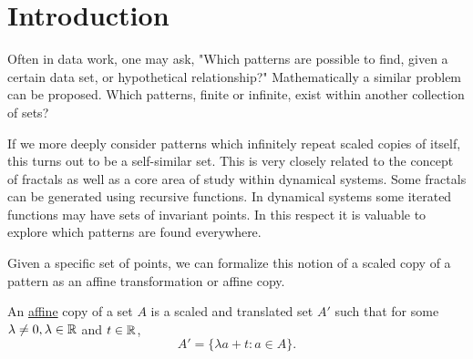 \chapter{Introduction}


Often in data work, one may ask, "Which patterns are possible to find, given a certain data set, or hypothetical relationship?"  Mathematically a similar problem can be proposed.  Which patterns, finite or infinite, exist within another collection of sets?  

If we more deeply consider patterns which infinitely repeat scaled copies of itself, this turns out to be a self-similar set.  This is very closely related to the concept of fractals as well as a core area of study within dynamical systems.  Some fractals can be generated using recursive functions.  In dynamical systems some iterated functions may have sets of invariant points.  In this respect it is valuable to explore which patterns are found everywhere. 

Given a specific set of points, we can formalize this notion of a scaled copy of a pattern as an affine transformation or affine copy.  
\begin{definition}
    An \underline{affine} copy of a set $A$ is a scaled and translated set $A'$ such that for some $\lambda\neq 0, \lambda \in \mathbb{R}$ and $t \in \mathbb{R}$,  $$A' = \{\lambda a + t : a \in A\}.$$
\end{definition}

